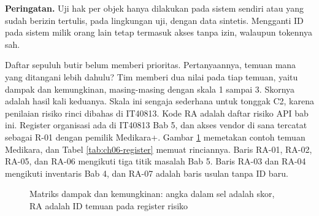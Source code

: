 \textbf{Peringatan.} Uji hak per objek hanya dilakukan pada sistem sendiri atau yang sudah berizin tertulis, pada lingkungan
uji, dengan data sintetis. Mengganti ID pada sistem milik orang lain tetap termasuk akses tanpa izin, walaupun tokennya sah.

Daftar sepuluh butir belum memberi prioritas. Pertanyaannya, temuan mana yang ditangani lebih dahulu? Tim memberi dua nilai
pada tiap temuan, yaitu dampak dan kemungkinan, masing-masing dengan skala 1 sampai 3. Skornya adalah hasil kali keduanya.
Skala ini sengaja sederhana untuk tonggak C2, karena penilaian risiko rinci dibahas di IT40813. Kode RA adalah daftar risiko API
bab ini. Register organisasi ada di IT40813 Bab 5, dan akses vendor di sana tercatat sebagai R-01 dengan pemilik Medikara+. Gambar
\ref{fig:ch06-matriks-risiko} memetakan contoh temuan Medikara, dan Tabel \ref{tab:ch06-register} memuat rinciannya. Baris
RA-01, RA-02, RA-05, dan RA-06 mengikuti tiga titik masalah Bab 5. Baris RA-03 dan RA-04 mengikuti inventaris Bab 4, dan RA-07
adalah baris usulan tanpa ID baru.

\begin{figure}[!htb]
  \centering
  
  \caption{Matriks dampak dan kemungkinan: angka dalam sel adalah skor, RA adalah ID temuan pada register risiko}
  \label{fig:ch06-matriks-risiko}
\end{figure}

